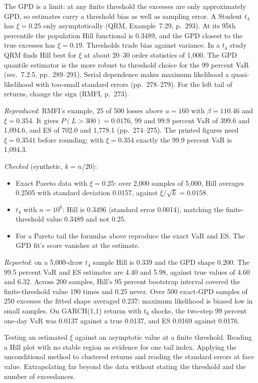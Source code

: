 \begin{qfmethod}
 The GPD is a limit: at any finite threshold the excesses are only approximately GPD, so estimates carry a threshold bias as well as sampling error. A Student $t_4$ has $\xi=0.25$ only asymptotically (QRM, Example~7.29, p.~293). At its 95th percentile the population Hill functional is 0.3489, and the GPD closest to the true excesses has $\xi=0.19$. Thresholds trade bias against variance. In a $t_4$ study QRM finds Hill best for $\xi$ at about 20--30 order statistics of 1{,}000. The GPD quantile estimator is the more robust to threshold choice for the 99 percent VaR (sec.~7.2.5, pp.~289--291). Serial dependence makes maximum likelihood a quasi-likelihood with too-small standard errors (pp.~278--279). For the left tail of returns, change the sign (RMFI, p.~273).

 \emph{Reproduced}: RMFI's example, 25 of 500 losses above $u=160$ with $\beta=110.46$ and $\xi=0.354$. It gives $P(L>300)=0.0176$, 99 and 99.9 percent VaR of 399.6 and 1{,}094.6, and ES of 702.0 and 1{,}778.1 (pp.~274--275). The printed figures need $\xi=0.3541$ before rounding; with $\xi=0.354$ exactly the 99.9 percent VaR is 1{,}094.3.

\emph{Checked} (synthetic, $k=n/20$):
\begin{itemize}
\item Exact Pareto data with $\xi=0.25$: over 2{,}000 samples of 5{,}000, Hill averages 0.2505 with standard deviation 0.0157, against $\xi/\sqrt k=0.0158$.
\item $t_4$ with $n=10^6$: Hill is 0.3496 (standard error 0.0014), matching the finite-threshold value 0.3489 and not 0.25.
\item For a Pareto tail the formulas above reproduce the exact VaR and ES. The GPD fit's score vanishes at the estimate.
\end{itemize}
\emph{Reported}: on a 5{,}000-draw $t_4$ sample Hill is 0.339 and the GPD shape 0.200. The 99.5 percent VaR and ES estimates are 4.40 and 5.98, against true values of 4.60 and 6.32. Across 200 samples, Hill's 95 percent bootstrap interval covered the finite-threshold value 190 times and 0.25 never. Over 500 exact-GPD samples of 250 excesses the fitted shape averaged 0.237: maximum likelihood is biased low in small samples. On GARCH(1,1) returns with $t_6$ shocks, the two-step 99 percent one-day VaR was 0.0137 against a true 0.0137, and ES 0.0169 against 0.0176.

 Testing an estimated $\xi$ against an asymptotic value at a finite threshold. Reading a Hill plot with no stable region as evidence for one tail index. Applying the unconditional method to clustered returns and reading the standard errors at face value. Extrapolating far beyond the data without stating the threshold and the number of exceedances.


\end{qfmethod}
